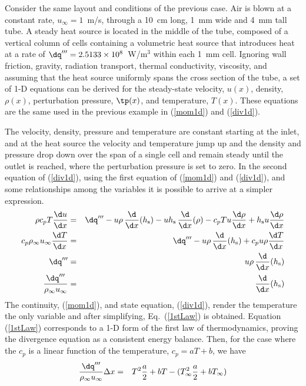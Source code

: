 \documentclass[11pt]{book}
\begin{document}
Consider the same layout and conditions of the previous case. Air is blown at a constant rate, $u_\infty=1$~m/s, through a 10~cm long, 1~mm wide and 4~mm tall tube. A steady heat source is located in the middle of the tube, composed of a vertical column of cells containing a volumetric heat source that introduces heat at a rate of $\dq'''=2.5133 \times 10^8$~W/m$^3$ within each 1~mm cell. Ignoring wall friction, gravity, radiation transport, thermal conductivity, viscosity, and assuming that the heat source uniformly spans the cross section of the tube, a set of 1-D equations can be derived for the steady-state velocity, $u(x)$, density, $\rho(x)$, perturbation pressure, $\tp(x)$, and temperature, $T(x)$. These equations are the same used in the previous example in (\ref{mom1d}) and (\ref{div1d}).

The velocity, density, pressure and temperature are constant starting at the inlet, and at the heat source the velocity and temperature jump up and the density and pressure drop down over the span of a single cell and remain steady until the outlet is reached, where the perturbation pressure is set to zero. In the second equation of (\ref{div1d}), using the first equation of (\ref{mom1d}) and (\ref{div1d}), and some relationships among the variables it is possible to arrive at a simpler expression.
\begin{eqnarray}
   \rho c_p T \frac{\d u}{\d x}  &=& \dq''' - u \rho \, \frac{\d}{\d x} (h_{\rm s}) - u h_{\rm s} \, \frac{\d}{\d x} (\rho) - c_p T u \frac{\d \rho}{\d x}  + h_{\rm s} u \frac{\d \rho}{\d x} \\
   c_p \rho_\infty u_\infty \frac{\d T}{\d x} &=& \dq'''  - u \rho \, \frac{\d}{\d x} (h_{\rm s}) + c_p u \rho \frac{\d T}{\d x}  \\
  \dq''' &=&   u \rho \, \frac{\d}{\d x} (h_{\rm s}) \\
  \frac{ \dq'''}{\rho_\infty u_\infty} &=&  \frac{\d}{\d x} (h_{\rm s})  \label{1stLaw}
\end{eqnarray}
The continuity, (\ref{mom1d}), and state equation, (\ref{div1d}), render the temperature the only variable and after simplifying, Eq.~(\ref{1stLaw}) is obtained. Equation (\ref{1stLaw}) corresponds to a 1-D form of the first law of thermodynamics, proving the divergence equation as a consistent energy balance. Then, for the case where the $c_p$ is a linear function of the temperature, $c_p=aT +b$, we have
\begin{eqnarray}
  \frac{ \dq'''}{\rho_\infty u_\infty} \Delta x &=&  T^2 \frac{a}{2} +bT -  (T_\infty^2 \frac{a}{2} +bT_\infty) \label{LinearCP}
\end{eqnarray}
\end{document}
